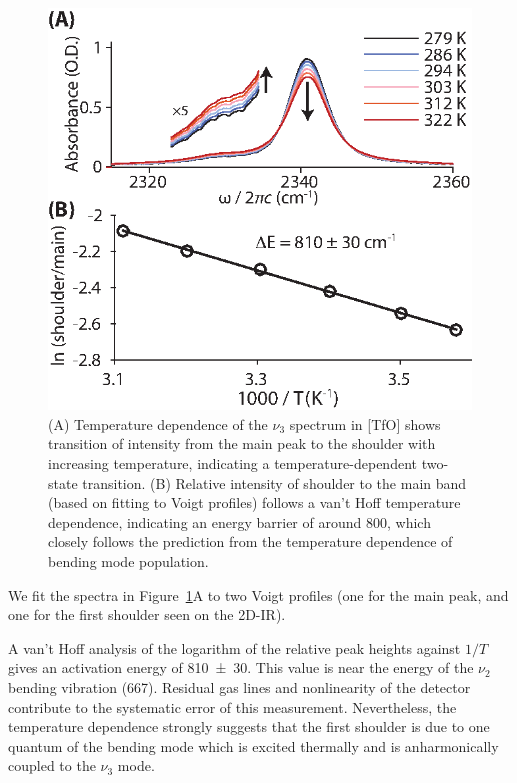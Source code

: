 \documentclass[%
  class = book,%
  crop = false,%
  float = true,%
  multi = true,%
  preview = false,%
]{standalone}
\begin{document}
{\begin{figure}
  \centering
  \includegraphics[scale=1.40]{fig3.eps}
  \caption[T-dependent FTIR of \texorpdfstring{}{carbon dioxide} in 1-butyl-3-methylimidazolium triflate]{\label{fig:hot band}(A) Temperature dependence of the \(\nu_3\) spectrum in \ce{[Im_{4,1}]}[TfO] shows transition of intensity from the main peak to the shoulder with increasing temperature, indicating a temperature-dependent two-state transition. (B) Relative intensity of shoulder to the main band (based on fitting to Voigt profiles) follows a van't Hoff temperature dependence, indicating an energy barrier of around \SI{800}{\wavenumber}, which closely follows the prediction from the temperature dependence of bending mode population.}
\end{figure}

We fit the spectra in Figure~\ref{fig:hot band}A to two Voigt profiles (one for the main peak, and one for the first shoulder seen on the 2D-IR).

A van't Hoff analysis of the logarithm of the relative peak heights against \(1/T\) gives an activation energy of \SI{810(30)}{\wavenumber}. This value is near the energy of the \(\nu_2\) bending vibration (\SI{667}{\wavenumber}). Residual gas lines and nonlinearity of the detector contribute to the systematic error of this measurement. Nevertheless, the temperature dependence strongly suggests that the first shoulder is due to one quantum of the bending mode which is excited thermally and is anharmonically coupled to the \(\nu_3\) mode.

}
\end{document}
